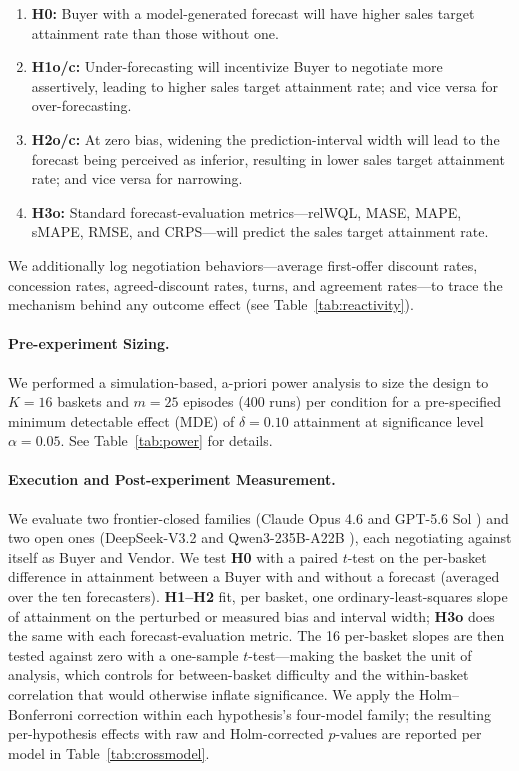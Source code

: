 \documentclass{article}
\begin{document}
\begin{enumerate}[left=0pt]
\item \textbf{H0:} Buyer with a model-generated forecast will have higher sales target attainment rate than those without one.
\item \textbf{H1o/c:} Under-forecasting will incentivize Buyer to negotiate more assertively, leading to higher sales target attainment rate; and vice versa for over-forecasting. 
\item \textbf{H2o/c:} At zero bias, widening the prediction-interval width will lead to the forecast being perceived as inferior, resulting in lower sales target attainment rate; and vice versa for narrowing.
\item \textbf{H3o:} Standard forecast-evaluation metrics---relWQL, MASE, MAPE, sMAPE, RMSE, and CRPS---will predict the sales target attainment rate.
\end{enumerate}
We additionally log negotiation behaviors---average first-offer discount rates, concession rates, agreed-discount rates, turns, and agreement rates---to trace the mechanism behind any outcome effect (see Table~\ref{tab:reactivity}).

\paragraph{Pre-experiment Sizing.} We performed a simulation-based, a-priori power analysis to size the design to $K=16$ baskets and $m=25$ episodes (400 runs) per condition for a pre-specified minimum detectable effect (MDE) of $\delta=0.10$ attainment at significance level $\alpha=0.05$. See Table~\ref{tab:power} for details.

\paragraph{Execution and Post-experiment Measurement.} We evaluate two frontier-closed families (Claude Opus 4.6 \citep{anthropic2026claudeopus46} and GPT-5.6 Sol \citep{openai2026gpt56sol}) and two open ones (DeepSeek-V3.2 \citep{liu2025deepseek} and Qwen3-235B-A22B \citep{yang2025qwen3}), each negotiating against itself as Buyer and Vendor. We test \textbf{H0} with a paired $t$-test on the per-basket difference in attainment between a Buyer with and without a forecast (averaged over the ten forecasters). \textbf{H1--H2} fit, per basket, one ordinary-least-squares slope of attainment on the perturbed or measured bias and interval width; \textbf{H3o} does the same with each forecast-evaluation metric. The 16 per-basket slopes are then tested against zero with a one-sample $t$-test---making the basket the unit of analysis, which controls for between-basket difficulty and the within-basket correlation that would otherwise inflate significance. We apply the Holm--Bonferroni correction within each hypothesis's four-model family; the resulting per-hypothesis effects with raw and Holm-corrected $p$-values are reported per model in Table~\ref{tab:crossmodel}.
\end{document}
